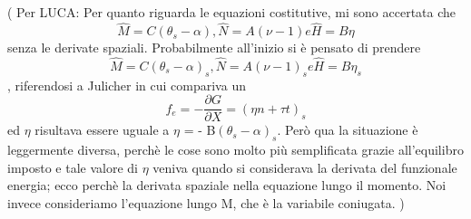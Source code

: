 \documentclass{article}
\begin{document}
\\\\\\\\
( Per LUCA: Per quanto riguarda le equazioni costitutive, mi sono accertata che 
\[ \hat{M} = C(\theta_s -\alpha), \hat{N} = A(\nu - 1) e \hat{H} = B\eta \]
senza le derivate spaziali. Probabilmente all'inizio si è pensato di prendere 
\[ \hat{M} = C(\theta_s -\alpha)_s, \hat{N} = A(\nu - 1)_s e \hat{H} = B\eta _s \]
, riferendosi a Julicher in cui compariva un 
\[ f_e = - \frac{\partial G}{\partial X} =(\eta n + \tau t)_s \]
ed $\eta$ risultava essere uguale a $\eta$ = - B$(\theta_s - \alpha)_s$. Però qua la situazione è leggermente diversa, perchè le cose sono molto più semplificata grazie all'equilibro imposto e tale valore di $\eta$ veniva quando si considerava la derivata del funzionale energia; ecco perchè la derivata spaziale nella equazione lungo il momento.
Noi invece consideriamo l'equazione lungo M, che è la variabile coniugata. )
\end{document}
